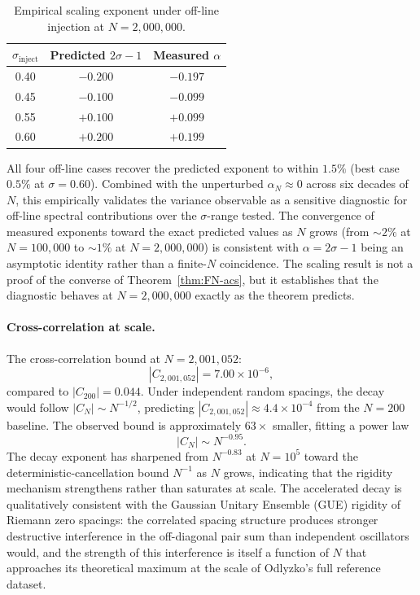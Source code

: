 \documentclass[11pt,a4paper]{article}
\theoremstyle{plain}
\theoremstyle{definition}
\theoremstyle{remark}
\begin{document}
\begin{table}[h]
\centering
\begin{tabular}{ccc}
\toprule
$\sigma_{\mathrm{inject}}$ & Predicted $2\sigma - 1$ & Measured $\alpha$ \\
\midrule
0.40 & $-0.200$ & $-0.197$ \\
0.45 & $-0.100$ & $-0.099$ \\
0.55 & $+0.100$ & $+0.099$ \\
0.60 & $+0.200$ & $+0.199$ \\
\bottomrule
\end{tabular}
\caption{Empirical scaling exponent under off-line injection at $N = 2{,}000{,}000$.}
\label{tab:injection-scaling}
\end{table}

All four off-line cases recover the predicted exponent to within
$1.5\%$ (best case $0.5\%$ at $\sigma = 0.60$). Combined with the
unperturbed $\alpha_N \approx 0$ across six decades of $N$, this
empirically validates the variance observable as a sensitive
diagnostic for off-line spectral contributions over the
$\sigma$-range tested. The convergence of measured exponents
toward the exact predicted values as $N$ grows
(from $\sim 2\%$ at $N = 100{,}000$ to $\sim 1\%$ at
$N = 2{,}000{,}000$) is consistent with $\alpha = 2\sigma - 1$
being an asymptotic identity rather than a finite-$N$ coincidence.
The scaling result is not a proof of the
converse of Theorem~\ref{thm:FN-acs}, but it establishes that the
diagnostic behaves at $N = 2{,}000{,}000$ exactly as the theorem
predicts.

\paragraph{Cross-correlation at scale.}
The cross-correlation bound at $N = 2{,}001{,}052$:
\[
|C_{2{,}001{,}052}| = 7.00 \times 10^{-6},
\]
compared to $|C_{200}| = 0.044$. Under independent random spacings,
the decay would follow $|C_N| \sim N^{-1/2}$, predicting
$|C_{2{,}001{,}052}| \approx 4.4 \times 10^{-4}$ from the $N = 200$
baseline. The observed bound is approximately $63\times$ smaller,
fitting a power law
\[
|C_N| \sim N^{-0.95}.
\]
The decay exponent has sharpened from $N^{-0.83}$ at $N = 10^5$
toward the deterministic-cancellation bound $N^{-1}$ as $N$ grows,
indicating that the rigidity mechanism strengthens rather than
saturates at scale. The accelerated decay is qualitatively
consistent with the Gaussian Unitary Ensemble (GUE) rigidity of
Riemann zero spacings: the correlated spacing structure produces
stronger destructive interference in the off-diagonal pair sum
than independent oscillators would, and the strength of this
interference is itself a function of $N$ that approaches its
theoretical maximum at the scale of Odlyzko's full reference
dataset.
\end{document}
